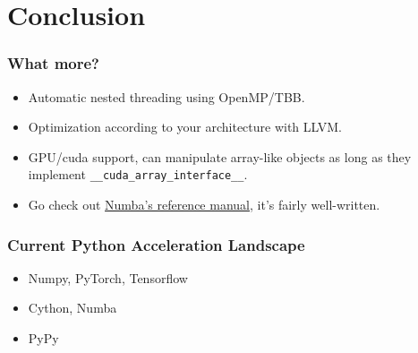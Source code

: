 \documentclass{beamer}
\newcommand{\icode}[1]{\texttt{#1}}  %
\begin{document}
\section{Conclusion}
\begin{frame}
\frametitle{What more?}
\begin{itemize}
\item<1-> Automatic nested threading using OpenMP/TBB.
\item<2-> Optimization according to your architecture with LLVM.
\item<3-> GPU/cuda support, can manipulate array-like objects as long as they implement \icode{__cuda_array_interface__}.
\item<4-> Go check out \href{https://numba.pydata.org/numba-doc/latest/reference/index.html}{Numba's reference manual}, it's fairly well-written.
\end{itemize}


\end{frame}
\begin{frame}
\frametitle{Current Python Acceleration Landscape}
\begin{itemize}
\item<1-> Numpy, PyTorch, Tensorflow 
\item<2-> Cython, Numba
\item<3-> PyPy
\end{itemize}
\end{frame}
\end{document}
